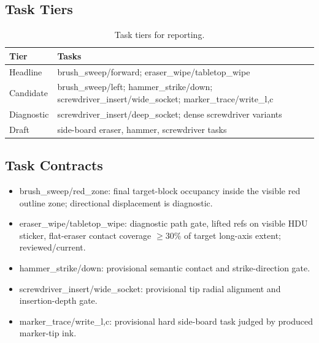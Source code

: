 \documentclass[journal]{IEEEtran}
\begin{document}
\subsection{Task Tiers}
\begin{table}[h]
\centering
\caption{Task tiers for reporting.}
\begin{tabular}{p{}p{}}
\toprule
Tier & Tasks \\
\midrule
Headline & brush\_sweep/forward; eraser\_wipe/tabletop\_wipe \\
Candidate & brush\_sweep/left; hammer\_strike/down; screwdriver\_insert/wide\_socket; marker\_trace/write\_l,c \\
Diagnostic & screwdriver\_insert/deep\_socket; dense screwdriver variants \\
Draft & side-board eraser, hammer, screwdriver tasks \\
\bottomrule
\end{tabular}
\end{table}

\subsection{Task Contracts}
\begin{itemize}
  \item brush\_sweep/red\_zone: final target-block occupancy inside the visible
  red outline zone; directional displacement is diagnostic.
  \item eraser\_wipe/tabletop\_wipe: diagnostic path gate, lifted refs on visible HDU
  sticker, flat-eraser contact coverage $\geq 30\%$ of target long-axis extent;
  reviewed/current.
  \item hammer\_strike/down: provisional semantic contact and strike-direction
  gate.
  \item screwdriver\_insert/wide\_socket: provisional tip radial alignment and
  insertion-depth gate.
  \item marker\_trace/write\_l,c: provisional hard side-board task judged by
  produced marker-tip ink.
\end{itemize}
\end{document}
